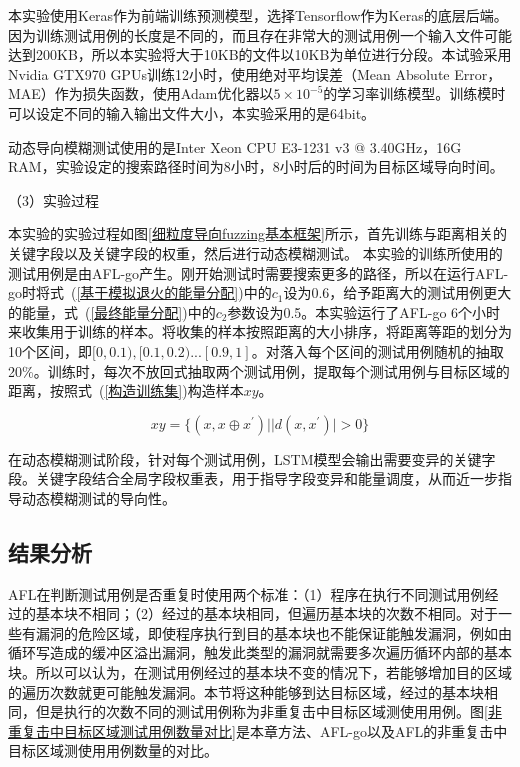 本实验使用Keras作为前端训练预测模型，选择Tensorflow作为Keras的底层后端。因为训练测试用例的长度是不同的，而且存在非常大的测试用例一个输入文件可能达到200KB，所以本实验将大于10KB的文件以10KB为单位进行分段。本试验采用Nvidia GTX970 GPUs训练12小时，使用绝对平均误差（Mean Absolute Error，MAE）作为损失函数，使用Adam优化器以$5 \times 10^{-5}$的学习率训练模型。训练模时可以设定不同的输入输出文件大小，本实验采用的是64bit。

动态导向模糊测试使用的是Inter Xeon CPU E3-1231 v3 @ 3.40GHz，16G RAM，实验设定的搜索路径时间为8小时，8小时后的时间为目标区域导向时间。

（3）实验过程

本实验的实验过程如图\ref{细粒度导向fuzzing基本框架}所示，首先训练与距离相关的关键字段以及关键字段的权重，然后进行动态模糊测试。
本实验的训练所使用的测试用例是由AFL-go产生。刚开始测试时需要搜索更多的路径，所以在运行AFL-go时将式~(\ref{基于模拟退火的能量分配})中的$c_1$设为0.6，给予距离大的测试用例更大的能量，式~(\ref{最终能量分配})中的$c_2$参数设为0.5。本实验运行了AFL-go 6个小时来收集用于训练的样本。将收集的样本按照距离的大小排序，将距离等距的划分为10个区间，即$[0,0.1),[0.1,0.2)...[0.9,1]$。对落入每个区间的测试用例随机的抽取20\%。训练时，每次不放回式抽取两个测试用例，提取每个测试用例与目标区域的距离，按照式~(\ref{构造训练集})构造样本$xy$。

\begin{equation}\label{构造训练集}
xy = \{(x,x \oplus x^{'}) | |d(x,x^{'})| > 0\}
\end{equation}

在动态模糊测试阶段，针对每个测试用例，LSTM模型会输出需要变异的关键字段。关键字段结合全局字段权重表，用于指导字段变异和能量调度，从而近一步指导动态模糊测试的导向性。

\subsection{结果分析}

AFL在判断测试用例是否重复时使用两个标准：（1）程序在执行不同测试用例经过的基本块不相同；（2）经过的基本块相同，但遍历基本块的次数不相同。对于一些有漏洞的危险区域，即使程序执行到目的基本块也不能保证能触发漏洞，例如由循环写造成的缓冲区溢出漏洞，触发此类型的漏洞就需要多次遍历循环内部的基本块。所以可以认为，在测试用例经过的基本块不变的情况下，若能够增加目的区域的遍历次数就更可能触发漏洞。本节将这种能够到达目标区域，经过的基本块相同，但是执行的次数不同的测试用例称为非重复击中目标区域测使用用例。图\ref{非重复击中目标区域测试用例数量对比}是本章方法、AFL-go以及AFL的非重复击中目标区域测使用用例数量的对比。

